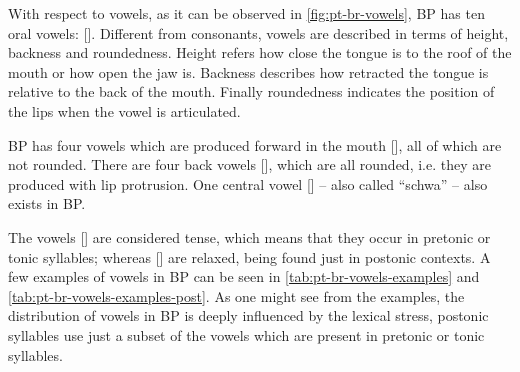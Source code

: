 With respect to vowels, as it can be observed in \autoref{fig:pt-br-vowels}, \ac{BP} has ten oral vowels: []. Different from consonants, vowels are described in terms of height, backness and roundedness. Height refers how close the tongue is to the roof of the mouth or how open the jaw is. Backness describes how retracted the tongue is relative to the back of the mouth. Finally roundedness indicates the position of the lips when the vowel is articulated.

\ac{BP} has four vowels which are produced forward in the mouth [], all of which are not rounded. There are four back vowels [], which are all rounded, i.e. they are produced with lip protrusion. One central vowel [] -- also called ``schwa'' -- also exists in \ac{BP}.

The vowels [] are considered tense, which means that they occur in pretonic or tonic syllables; whereas [] are relaxed, being found just in postonic contexts. A few examples of vowels in \ac{BP} can be seen in \autoref{tab:pt-br-vowels-examples} and \autoref{tab:pt-br-vowels-examples-post}. As one might see from the examples, the distribution of vowels in \ac{BP} is deeply influenced by the lexical stress, postonic syllables use just a subset of the vowels which are present in pretonic or tonic syllables.

